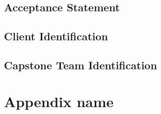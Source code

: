 \documentclass[10pt,letterpaper]{article}
\begin{document}
\subsection{Acceptance Statement}
\subsection{Client Identification}
\subsection{Capstone Team Identification}


\clearpage
{}



\clearpage
\appendix
\section{Appendix name}\label{appendix:sample-appendix}
\end{document}
